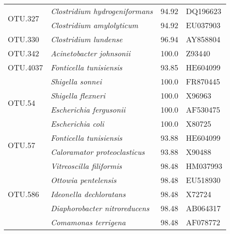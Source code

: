 \begin{table}[ht]
{\begin{tabular}{l>{\itshape}lrl}
\multirow{2}{*}{OTU.327} & Clostridium hydrogeniformans & 94.92 & DQ196623 \\  & Clostridium amylolyticum & 94.92 & EU037903 \\ \midrule
\multirow{1}{*}{OTU.330} & Clostridium lundense & 96.94 & AY858804 \\ \midrule
\multirow{1}{*}{OTU.342} & Acinetobacter johnsonii & 100.0 & Z93440 \\ \midrule
\multirow{1}{*}{OTU.4037} & Fonticella tunisiensis & 93.85 & HE604099 \\ \midrule
\multirow{4}{*}{OTU.54} & Shigella sonnei & 100.0 & FR870445 \\  & Shigella flexneri & 100.0 & X96963 \\  & Escherichia fergusonii & 100.0 & AF530475 \\  & Escherichia coli & 100.0 & X80725 \\ \midrule
\multirow{2}{*}{OTU.57} & Fonticella tunisiensis & 93.88 & HE604099 \\  & Caloramator proteoclasticus & 93.88 & X90488 \\ \midrule
\multirow{5}{*}{OTU.586} & Vitreoscilla filiformis & 98.48 & HM037993 \\  & Ottowia pentelensis & 98.48 & EU518930 \\  & Ideonella dechloratans & 98.48 & X72724 \\  & Diaphorobacter nitroreducens & 98.48 & AB064317 \\  & Comamonas terrigena & 98.48 & AF078772 \\ \midrule

    \bottomrule
\end{tabular}}{}
\end{table}
